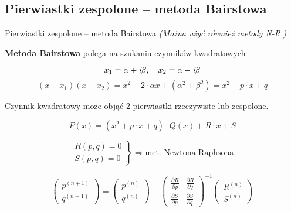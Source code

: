 \subsection{Pierwiastki zespolone -- metoda Bairstowa}

\begin{frame}{Pierwiastki zespolone -- metoda Bairstowa}
  \textit{(Można użyć również metody N-R.)}

  \vspace{5px}

  \textbf{Metoda Bairstowa} polega na szukaniu czynników kwadratowych

  $$x_1 = \alpha + \textit{\textrm{i}}\beta, \quad x_2 = \alpha - \textit{\textrm{i}}\beta$$
  $$(x - x_1)(x - x_2) = x^2 - 2 \cdot \alpha x + (\alpha^2 + \beta^2) = x^2 + p \cdot x + q$$

  Czynnik kwadratowy może objąć 2 pierwiastki rzeczywiste lub zespolone.

  \begin{equation}
    P(x) = (x^2 + p \cdot x + q) \cdot Q(x) + R \cdot x + S \label{bairstow}
  \end{equation}
\end{frame}

\begin{frame}
  $$\left. \begin{array}{l}
  R(p,q)=0 \\ S(p,q)=0
  \end{array}\right\} \Rightarrow \text{met. Newtona-Raphsona}$$

  \vspace{5mm}

  $$\left( \begin{array}{l}
  p^{(n+1)} \\ q^{(n+1)}
  \end{array} \right)
  =
  \left( \begin{array}{l}
  p^{(n)} \\ q^{(n)}
  \end{array} \right)
  -
  \left( \begin{array}{ll}
  \frac{{\partial}R}{{\partial}p} & \frac{{\partial}R}{{\partial}q} \\
  \frac{{\partial}S}{{\partial}p} & \frac{{\partial}S}{{\partial}q}
  \end{array} \right)^{-1}
  \left( \begin{array}{l}
  R^{(n)} \\ S^{(n)}
  \end{array} \right)$$
\end{frame}

